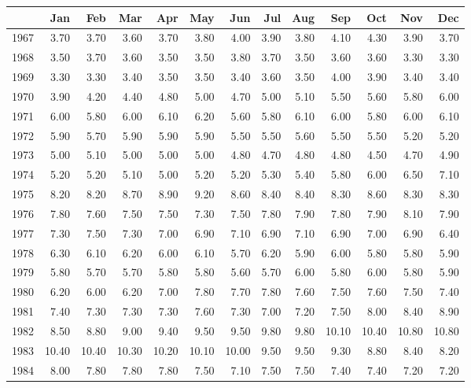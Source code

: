 \begin{longtable}{rrrrrrrrrrrrr}
  \hline
 & Jan & Feb & Mar & Apr & May & Jun & Jul & Aug & Sep & Oct & Nov & Dec \\ 
  \hline
1967 & 3.70 & 3.70 & 3.60 & 3.70 & 3.80 & 4.00 & 3.90 & 3.80 & 4.10 & 4.30 & 3.90 & 3.70 \\ 
  1968 & 3.50 & 3.70 & 3.60 & 3.50 & 3.50 & 3.80 & 3.70 & 3.50 & 3.60 & 3.60 & 3.30 & 3.30 \\ 
  1969 & 3.30 & 3.30 & 3.40 & 3.50 & 3.50 & 3.40 & 3.60 & 3.50 & 4.00 & 3.90 & 3.40 & 3.40 \\ 
  1970 & 3.90 & 4.20 & 4.40 & 4.80 & 5.00 & 4.70 & 5.00 & 5.10 & 5.50 & 5.60 & 5.80 & 6.00 \\ 
  1971 & 6.00 & 5.80 & 6.00 & 6.10 & 6.20 & 5.60 & 5.80 & 6.10 & 6.00 & 5.80 & 6.00 & 6.10 \\ 
  1972 & 5.90 & 5.70 & 5.90 & 5.90 & 5.90 & 5.50 & 5.50 & 5.60 & 5.50 & 5.50 & 5.20 & 5.20 \\ 
  1973 & 5.00 & 5.10 & 5.00 & 5.00 & 5.00 & 4.80 & 4.70 & 4.80 & 4.80 & 4.50 & 4.70 & 4.90 \\ 
  1974 & 5.20 & 5.20 & 5.10 & 5.00 & 5.20 & 5.20 & 5.30 & 5.40 & 5.80 & 6.00 & 6.50 & 7.10 \\ 
  1975 & 8.20 & 8.20 & 8.70 & 8.90 & 9.20 & 8.60 & 8.40 & 8.40 & 8.30 & 8.60 & 8.30 & 8.30 \\ 
  1976 & 7.80 & 7.60 & 7.50 & 7.50 & 7.30 & 7.50 & 7.80 & 7.90 & 7.80 & 7.90 & 8.10 & 7.90 \\ 
  1977 & 7.30 & 7.50 & 7.30 & 7.00 & 6.90 & 7.10 & 6.90 & 7.10 & 6.90 & 7.00 & 6.90 & 6.40 \\ 
  1978 & 6.30 & 6.10 & 6.20 & 6.00 & 6.10 & 5.70 & 6.20 & 5.90 & 6.00 & 5.80 & 5.80 & 5.90 \\ 
  1979 & 5.80 & 5.70 & 5.70 & 5.80 & 5.80 & 5.60 & 5.70 & 6.00 & 5.80 & 6.00 & 5.80 & 5.90 \\ 
  1980 & 6.20 & 6.00 & 6.20 & 7.00 & 7.80 & 7.70 & 7.80 & 7.60 & 7.50 & 7.60 & 7.50 & 7.40 \\ 
  1981 & 7.40 & 7.30 & 7.30 & 7.30 & 7.60 & 7.30 & 7.00 & 7.20 & 7.50 & 8.00 & 8.40 & 8.90 \\ 
  1982 & 8.50 & 8.80 & 9.00 & 9.40 & 9.50 & 9.50 & 9.80 & 9.80 & 10.10 & 10.40 & 10.80 & 10.80 \\ 
  1983 & 10.40 & 10.40 & 10.30 & 10.20 & 10.10 & 10.00 & 9.50 & 9.50 & 9.30 & 8.80 & 8.40 & 8.20 \\ 
  1984 & 8.00 & 7.80 & 7.80 & 7.80 & 7.50 & 7.10 & 7.50 & 7.50 & 7.40 & 7.40 & 7.20 & 7.20 \\ 

\end{longtable}
